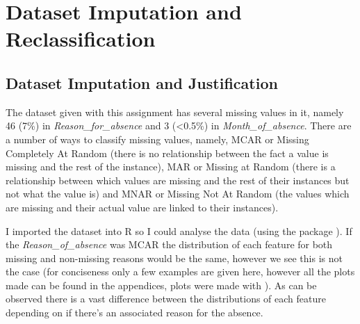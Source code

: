 \section{Dataset Imputation and Reclassification}
\subsection{Dataset Imputation and Justification}
The dataset given with this assignment has several missing values in it, namely 46 (7\%) in \textit{Reason\_for\_absence} and 3 (\textless 0.5\%) in \textit{Month\_of\_absence}. There are a number of ways to classify missing values, namely, MCAR or Missing Completely At Random (there is no relationship between the fact a value is missing and the rest of the instance), MAR or Missing at Random (there is a relationship between which values are missing and the rest of their instances but not what the value is) and MNAR or Missing Not At Random (the values which are missing and their actual value are linked to their instances). 

I imported the dataset into R \cite{langR} so I could analyse the data (using the package \cite{packfarff}). If the \textit{Reason\_of\_absence} was MCAR the distribution of each feature for both missing and non-missing reasons would be the same, however we see this is not the case (for conciseness only a few examples are given here, however all the plots made can be found in the appendices, plots were made with \cite{packggplot2}). As can be observed there is a vast difference between the distributions of each feature depending on if there's an associated reason for the absence. 


